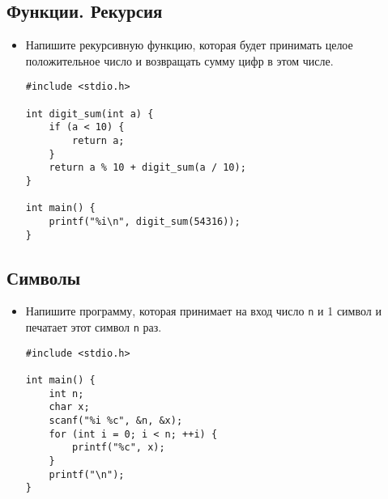 \documentclass{article}
\begin{document}
\subsection*{Функции. Рекурсия}
\begin{itemize}
\item Напишите рекурсивную функцию, которая будет принимать целое положительное число и возвращать сумму цифр в этом числе.
\begin{lstlisting}[backgroundcolor = \color{solcolor}]
#include <stdio.h>

int digit_sum(int a) {
    if (a < 10) {
        return a;
    }
    return a % 10 + digit_sum(a / 10);
}

int main() {
    printf("%i\n", digit_sum(54316));
}
\end{lstlisting}
\end{itemize}

\subsection*{Символы}
\begin{itemize}
\item Напишите программу, которая принимает на вход число \texttt{n} и 1 символ и печатает этот символ \texttt{n} раз.
\begin{lstlisting}[backgroundcolor = \color{solcolor}]
#include <stdio.h>

int main() {
    int n;
    char x;
    scanf("%i %c", &n, &x);
    for (int i = 0; i < n; ++i) {
        printf("%c", x);
    }
    printf("\n");
}

\end{lstlisting}
\end{itemize}

\newpage
\end{document}
